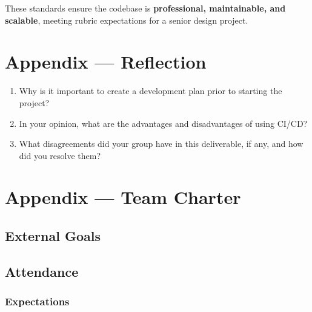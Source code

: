\documentclass{article}
\begin{document}
These standards ensure the codebase is \textbf{professional, maintainable, and scalable}, meeting rubric expectations for a senior design project.

\newpage{}

\section*{Appendix --- Reflection}




\begin{enumerate}
    \item Why is it important to create a development plan prior to starting the
    project?
    \item In your opinion, what are the advantages and disadvantages of using
    CI/CD?
    \item What disagreements did your group have in this deliverable, if any,
    and how did you resolve them?
\end{enumerate}

\newpage{}

\section*{Appendix --- Team Charter}


\subsection*{External Goals}


\subsection*{Attendance}

\subsubsection*{Expectations}
\end{document}
